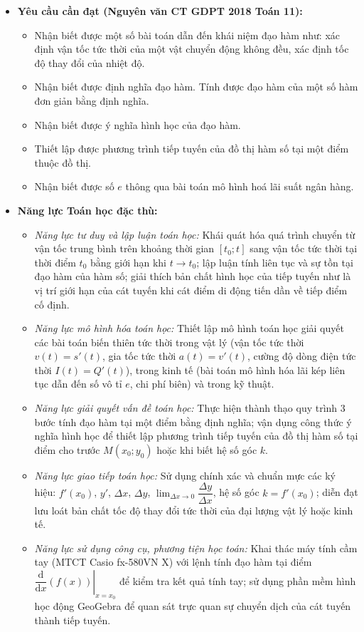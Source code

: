 \documentclass[12pt, a4paper]{article}
\begin{document}
\begin{itemize}[leftmargin=1.2cm]
    \item \textbf{Yêu cầu cần đạt (Nguyên văn CT GDPT 2018 Toán 11):}
    \begin{itemize}[leftmargin=0.6cm]
        \item Nhận biết được một số bài toán dẫn đến khái niệm đạo hàm như: xác định vận tốc tức thời của một vật chuyển động không đều, xác định tốc độ thay đổi của nhiệt độ.
        \item Nhận biết được định nghĩa đạo hàm. Tính được đạo hàm của một số hàm đơn giản bằng định nghĩa.
        \item Nhận biết được ý nghĩa hình học của đạo hàm.
        \item Thiết lập được phương trình tiếp tuyến của đồ thị hàm số tại một điểm thuộc đồ thị.
        \item Nhận biết được số $e$ thông qua bài toán mô hình hoá lãi suất ngân hàng.
    \end{itemize}

    \item \textbf{Năng lực Toán học đặc thù:}
    \begin{itemize}[leftmargin=0.6cm]
        \item \textit{Năng lực tư duy và lập luận toán học:} Khái quát hóa quá trình chuyển từ vận tốc trung bình trên khoảng thời gian $[t_0; t]$ sang vận tốc tức thời tại thời điểm $t_0$ bằng giới hạn khi $t \to t_0$; lập luận tính liên tục và sự tồn tại đạo hàm của hàm số; giải thích bản chất hình học của tiếp tuyến như là vị trí giới hạn của cát tuyến khi cát điểm di động tiến dần về tiếp điểm cố định.
        \item \textit{Năng lực mô hình hóa toán học:} Thiết lập mô hình toán học giải quyết các bài toán biến thiên tức thời trong vật lý (vận tốc tức thời $v(t) = s'(t)$, gia tốc tức thời $a(t) = v'(t)$, cường độ dòng điện tức thời $I(t) = Q'(t)$), trong kinh tế (bài toán mô hình hóa lãi kép liên tục dẫn đến số vô tỉ $e$, chi phí biên) và trong kỹ thuật.
        \item \textit{Năng lực giải quyết vấn đề toán học:} Thực hiện thành thạo quy trình 3 bước tính đạo hàm tại một điểm bằng định nghĩa; vận dụng công thức ý nghĩa hình học để thiết lập phương trình tiếp tuyến của đồ thị hàm số tại điểm cho trước $M(x_0; y_0)$ hoặc khi biết hệ số góc $k$.
        \item \textit{Năng lực giao tiếp toán học:} Sử dụng chính xác và chuẩn mực các ký hiệu: $f'(x_0)$, $y'$, $\Delta x$, $\Delta y$, $\lim_{\Delta x \to 0} \dfrac{\Delta y}{\Delta x}$, hệ số góc $k = f'(x_0)$; diễn đạt lưu loát bản chất tốc độ thay đổi tức thời của đại lượng vật lý hoặc kinh tế.
        \item \textit{Năng lực sử dụng công cụ, phương tiện học toán:} Khai thác máy tính cầm tay (MTCT Casio fx-580VN X) với lệnh tính đạo hàm tại điểm $\left. \dfrac{\mathrm{d}}{\mathrm{d}x} \left( f(x) \right) \right|_{x = x_0}$ để kiểm tra kết quả tính tay; sử dụng phần mềm hình học động GeoGebra để quan sát trực quan sự chuyển dịch của cát tuyến thành tiếp tuyến.
    \end{itemize}


\end{itemize}
\end{document}
